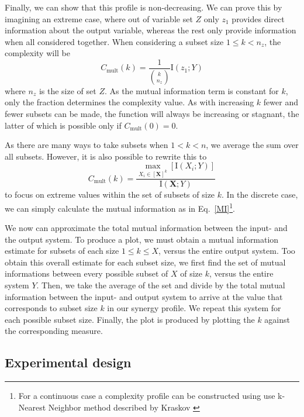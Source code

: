 \documentclass[../main.tex]{subfiles}
\begin{document}
Finally, we can show that this profile is non-decreasing.
We can prove this by imagining an extreme case, where out of variable set $Z$ only $z_1$ provides direct information about the output variable, whereas the rest only provide information when all considered together.
When considering a subset size $1 \le k < n_z $, the complexity will be
%
\begin{equation}
C_\mathrm{mult}\left( k \right)  = \frac{1}{\binom{k}{n_z}} \mathrm{I}\left( z_1;Y\right)
\end{equation}
%
where $n_z$ is the size of set $Z$.
As the mutual information term is constant for $k$, only the fraction determines the complexity value.
As with increasing $k$ fewer and fewer subsets can be made, the function will always be increasing or stagnant, the latter of which is possible only if $C_\mathrm{mult}\left( 0 \right) = 0$.

As there are many ways to take subsets when $1 < k < n$, we average the sum over all subsets.
However, it is also possible to rewrite this to
%
\begin{equation}
C_\mathrm{mult}\left( k \right) = \frac{\max_{X_i \in [\mathbf{X}]^k} [\mathrm{I}\left( X_i;Y \right)]}{\mathrm{I}\left( \mathbf{X};Y\right)}
\end{equation}
%
to focus on extreme values within the set of subsets of size $k$.
In the discrete case, we can simply calculate the mutual information as in Eq.~\ref{MI}\footnote{For a continuous case a complexity profile can be constructed using use k-Nearest Neighbor method described by Kraskov \cite{kraskov2004estimating}}.

We now can approximate the total mutual information between the input- and the output system.
To produce a plot, we must obtain a mutual information estimate for subsets of each size $1 \le k \le X$, versus the entire output system.
Too obtain this overall estimate for each subset size, we first find the set of mutual informations between every possible subset of $X$ of size $k$, versus the entire system $Y$.
Then, we take the average of the set and divide by the total mutual information between the input- and output system to arrive at the value that corresponds to subset size $k$ in our synergy profile.
We repeat this system for each possible subset size.
Finally, the plot is produced by plotting the $k$ against the corresponding measure.

\subsection{Experimental design}
\end{document}
